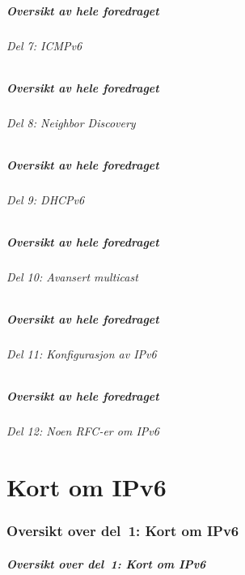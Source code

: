 \begin{frame}%
  \frametitle{Oversikt av hele foredraget}
  \framesubtitle{Del 7: ICMPv6}
  \tableofcontents[part=7]%
\end{frame}

\begin{frame}%
  \frametitle{Oversikt av hele foredraget}
  \framesubtitle{Del 8: Neighbor Discovery}
  \tableofcontents[part=8]%
\end{frame}

\begin{frame}%
  \frametitle{Oversikt av hele foredraget}
  \framesubtitle{Del 9: DHCPv6}
  \tableofcontents[part=9]%
\end{frame}

\begin{frame}%
  \frametitle{Oversikt av hele foredraget}
  \framesubtitle{Del 10: Avansert multicast}
  \tableofcontents[part=10]%
\end{frame}

\begin{frame}%
  \frametitle{Oversikt av hele foredraget}
  \framesubtitle{Del 11: Konfigurasjon av IPv6}
  \tableofcontents[part=11]%
\end{frame}

\begin{frame}%
  \frametitle{Oversikt av hele foredraget}
  \framesubtitle{Del 12: Noen RFC-er om IPv6}
  \tableofcontents[part=12]%
\end{frame}

\part{Kort om IPv6}

\begin{frame}
  \partpage
\end{frame}

\section*{Oversikt over del~1: Kort om IPv6}
\begin{frame}%
  \frametitle{Oversikt over del~1: Kort om IPv6}
    \tableofcontents%
\end{frame}

